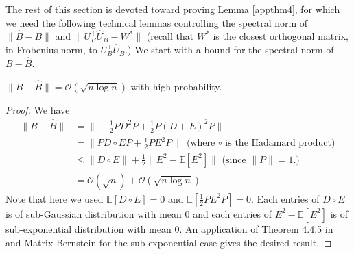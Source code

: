 The rest of this section is devoted toward proving Lemma \ref{appthm4}, for which we need the following technical lemmas controlling the spectral norm of $\|\hat{B} - B\|$ and $\|U_B^{\top} \hat{U}_B - W^{*}\|$ (recall that $W^*$ is the closest orthogonal matrix, in Frobenius norm, to $U_B^{\top} \hat{U}_B$.) 
We start with a bound for the spectral norm of $B - \hat{B}$. 

\begin{proposition}
\label{appthm6}
  $\|B - \hat{B}\| = \mathcal{O}(\sqrt{n \log n})$ with high probability.
\end{proposition}
\begin{proof}
 We have
  \begin{align*}
    \|B - \hat{B}\| & = \| -\frac{1}{2} P D^2 P +  \frac{1}{2} P (D+E)^2 P\|\\
    & = \|P D \circ E P + \frac{1}{2} P E^2 P\| \textrm{ (where $\circ$ is the Hadamard product)}\\      
    & \leq \|D \circ E\| + \frac{1}{2} \| E^2 - \mathbb{E} [E^2] \| \textrm{ (since $\|P\| = 1.)$ }\\
    & = \mathcal{O}(\sqrt{n}) + \mathcal{O}(\sqrt{n \log n})
  \end{align*}
  Note that here we used $\mathbb{E}[D \circ E] = 0$ and $\mathbb{E}[\frac{1}{2}P E^2 P ] = 0$. Each entries of $D \circ E$ is of sub-Gaussian distribution with mean $0$ and each entries of $E^2 - \mathbb{E} [E^2]$ is of sub-exponential distribution with mean $0$. An application of Theorem 4.4.5 in \cite{HDP} and Matrix Bernstein for the sub-exponential case gives the desired result.
\end{proof}

